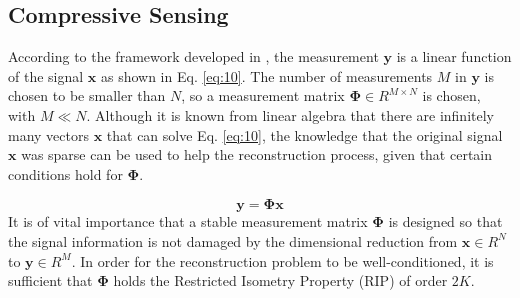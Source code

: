 \documentclass[conference]{IEEEtran}
\begin{document}
\subsection{Compressive Sensing}
\label{sec:compressive-sensing}

According to the framework developed in \cite{Candes2006, Candes2006a, Donoho2006}, the measurement $\boldsymbol{y}$ is a linear function of the signal $\boldsymbol{x}$ as shown in Eq. \eqref{eq:10}. The number of measurements $M$ in $\boldsymbol{y}$ is chosen to be smaller than $N$, so a measurement matrix $\boldsymbol{\Phi} \in R^{M \times N}$ is chosen, with $M \ll N$. Although it is known from linear algebra that there are infinitely many vectors $\boldsymbol{x}$ that can solve Eq. \eqref{eq:10}, the knowledge that the original signal $\boldsymbol{x}$ was sparse can be used to help the reconstruction process, given that certain conditions hold for $\boldsymbol{\Phi}$. 

%
\begin{equation}
  \label{eq:10}
\boldsymbol{y} =\boldsymbol{\Phi x}
\end{equation}
It is of vital importance that a stable measurement matrix $\boldsymbol{\Phi}$ is designed so that the signal information is not damaged by the dimensional reduction from $\boldsymbol{x} \in R^N$ to $\boldsymbol{y} \in R^M$. In order for the reconstruction problem to be well-conditioned, it is sufficient that ${\boldsymbol{\Phi}}$ holds the Restricted Isometry Property (RIP) \cite{Donoho2006} of order $2K$. 
\end{document}
